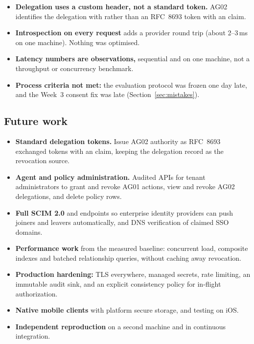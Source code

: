 \begin{itemize}
  \item \textbf{Delegation uses a custom header, not a standard token.} AG02 identifies the delegation with  rather than an RFC~8693 token with an  claim.
  \item \textbf{Introspection on every request} adds a provider round trip (about 2--3\,ms on one machine). Nothing was optimised.
  \item \textbf{Latency numbers are observations,} sequential and on one machine, not a throughput or concurrency benchmark.
  \item \textbf{Process criteria not met:} the evaluation protocol was frozen one day late, and the Week~3 consent fix was late (Section~\ref{sec:mistakes}).
\end{itemize}

\subsection{Future work}
\begin{itemize}
  \item \textbf{Standard delegation tokens.} Issue AG02 authority as RFC~8693 exchanged tokens with an  claim, keeping the delegation record as the revocation source.
  \item \textbf{Agent and policy administration.} Audited APIs for tenant administrators to grant and revoke AG01 actions, view and revoke AG02 delegations, and delete policy rows.
  \item \textbf{Full SCIM 2.0}  and  endpoints so enterprise identity providers can push joiners and leavers automatically, and DNS verification of claimed SSO domains.
  \item \textbf{Performance work} from the measured baseline: concurrent load, composite indexes and batched relationship queries, without caching away revocation.
  \item \textbf{Production hardening:} TLS everywhere, managed secrets, rate limiting, an immutable audit sink, and an explicit consistency policy for in-flight authorization.
  \item \textbf{Native mobile clients} with platform secure storage, and testing on iOS.
  \item \textbf{Independent reproduction} on a second machine and in continuous integration.
\end{itemize}
